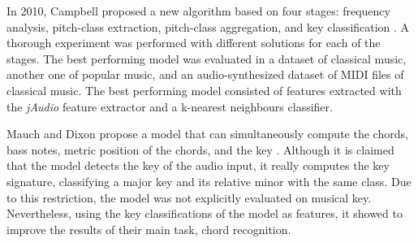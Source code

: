 In 2010, Campbell proposed a new algorithm based on four stages: frequency analysis, pitch-class extraction, pitch-class aggregation, and key classification \cite{campbell2010automatic}. A thorough experiment was performed with different solutions for each of the stages. The best performing model was evaluated in a dataset of classical music, another one of popular music, and an audio-synthesized dataset of MIDI files of classical music. The best performing model consisted of features extracted with the \emph{jAudio} feature extractor and a k-nearest neighbours classifier.

Mauch and Dixon propose a model that can simultaneously compute the chords, bass notes, metric position of the chords, and the key \cite{mauch2010simultaneous}. Although it is claimed that the model detects the key of the audio input, it really computes the key signature, classifying a major key and its relative minor with the same class. Due to this restriction, the model was not explicitly evaluated on musical key. Nevertheless, using the key classifications of the model as features, it showed to improve the results of their main task, chord recognition.













